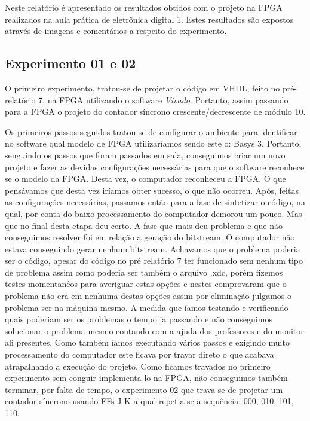 \documentclass[12pts]{article}
\begin{document}
	Neste relatório é apresentado os resultados obtidos com o projeto na FPGA realizados na aula prática de eletrônica digital 1. Estes resultados são expostos através de imagens e comentários a respeito do experimento. 

\subsection{Experimento 01 e 02}
\singlespacing
	O primeiro experimento, tratou-se de projetar o código em VHDL, feito no pré-relatório 7, na FPGA utilizando o software \textit{Vivado}. Portanto, assim passando para a FPGA o projeto do contador síncrono crescente/decrescente de módulo 10.

	Os primeiros passos seguidos tratou se de configurar o ambiente para identificar no software qual modelo de FPGA utilizaríamos sendo este o: Basys 3. Portanto, senguindo os passos que foram passados em sala, conseguimos criar um novo projeto e fazer as devidas configurações necessárias para que o software reconhece se o modelo da FPGA. Desta vez, o computador reconheceu a FPGA. O que pensávamos que desta vez iríamos obter sucesso, o que não ocorreu. 
	Após, feitas as configurações necessárias, passamos então para a fase de sintetizar o código, na qual, por conta do baixo processamento do computador demorou um pouco. Mas que no final desta etapa deu certo. A fase que mais deu problema e que não conseguimos resolver foi em relação a geração do bitstream. O computador não estava conseguindo gerar nenhum bitstream. Achavamos que o problema poderia ser o código, apesar do código no pré relatório 7 ter funcionado sem nenhum tipo de problema assim como poderia ser também o arquivo .xdc, porém fizemos testes momentanêos para averiguar estas opções e nestes comprovaram que o problema não era em nenhuma destas opções assim por eliminação julgamos o problema ser na máquina mesmo. A medida que íamos testando e verificando quais poderiam ser os problemas o tempo ia passando e não conseguimos solucionar o problema mesmo contando com a ajuda dos professores e do monitor ali presentes. Como também íamos executando vários passos e exigindo muito processamento do computador este ficava por travar direto o que acabava atrapalhando a execução do projeto.  
	Como ficamos travados no primeiro experimento sem conguir implementa lo na FPGA, não conseguimos também terminar, por falta de tempo, o experimento 02 que trava se de projetar um contador síncrono usando FFs J-K a qual repetia se a sequência: 000, 010, 101, 110.
\end{document}
